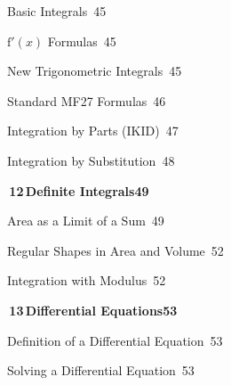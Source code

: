 \documentclass[a4paper,openany]{book}
\begin{document}
{\noindent{}\quad Basic Integrals\dotfill\ 45\par
\noindent{}\quad $\mathrm {f}'(x)$ Formulas\dotfill\ 45\par
\noindent{}\quad New Trigonometric Integrals\dotfill\ 45\par
\noindent{}\quad Standard MF27 Formulas\dotfill\ 46\par
\noindent{}\quad Integration by Parts (IKID)\dotfill\ 47\par
\noindent{}\quad Integration by Substitution\dotfill\ 48\par
\medskip\noindent\colorbox{blue!8}{\parbox{\dimexpr\textwidth-2\fboxsep}{\large\bfseries\color{blue!50!black}\colorbox{blue!50!black}{\color{white}\,12\,}\quad Definite Integrals\hfill 49}}\par\nopagebreak\smallskip\nopagebreak
\noindent{}\quad Area as a Limit of a Sum\dotfill\ 49\par
\noindent{}\quad Regular Shapes in Area and Volume\dotfill\ 52\par
\noindent{}\quad Integration with Modulus\dotfill\ 52\par
\medskip\noindent\colorbox{blue!8}{\parbox{\dimexpr\textwidth-2\fboxsep}{\large\bfseries\color{blue!50!black}\colorbox{blue!50!black}{\color{white}\,13\,}\quad Differential Equations\hfill 53}}\par\nopagebreak\smallskip\nopagebreak
\noindent{}\quad Definition of a Differential Equation\dotfill\ 53\par
\noindent{}\quad Solving a Differential Equation\dotfill\ 53\par
}
\end{document}
